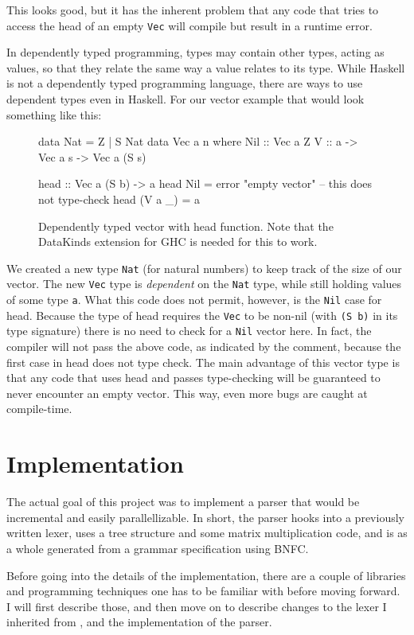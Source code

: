 \documentclass[a4paper,12pt,twosided]{report}
\begin{document}
This looks good, but it has the inherent problem that any code that tries to
access the head of an empty \texttt{Vec} will compile but result in a runtime error. 

In dependently typed programming, types may contain other types, acting as
values, so that they relate the same way a value relates to its type. While
Haskell is not a dependently typed programming language, there are ways to use
dependent types even in Haskell. For our vector example that would look
something like this:
\begin{figure}[H]
\begin{code}
data Nat = Z | S Nat
data Vec a n where
    Nil :: Vec a Z
    V :: a -> Vec a s -> Vec a (S s)

head :: Vec a (S b) -> a
head Nil = error "empty vector" -- this does not type-check
head (V a _) = a
\end{code}
\caption{Dependently typed vector with head function. Note that the DataKinds
extension for GHC is needed for this to work.}
\end{figure}

We created a new type \texttt{Nat} (for natural numbers) to keep track of the
size of our vector. The new \texttt{Vec} type is \textit{dependent} on the
\texttt{Nat} type, while still holding values of some type \texttt{a}. What this
code does not permit, however, is the \texttt{Nil} case for head. Because the
type of head requires the \texttt{Vec} to be non-nil (with \texttt{(S b)} in its
type signature) there is no need to check for a \texttt{Nil} vector here. In
fact, the compiler will not pass the above code, as indicated by the comment,
because the first case in head does not type check. The main advantage of this
vector type is that any code that uses head and passes type-checking will be
guaranteed to never encounter an empty vector.  This way, even more bugs are
caught at compile-time.

%
%

\chapter{Implementation}
The actual goal of this project was to implement a parser that would be
incremental and easily parallellizable. In short, the parser hooks into a
previously written lexer, uses a tree structure and some matrix multiplication
code, and is as a whole generated from a grammar specification using BNFC.

Before going into the details of the implementation, there are a
couple of libraries and programming techniques one has to be familiar with
before moving forward. I will first describe those, and then move on to describe
changes to the lexer I inherited from \citeauthor{divconqlex}, and the
implementation of the parser.
\end{document}
